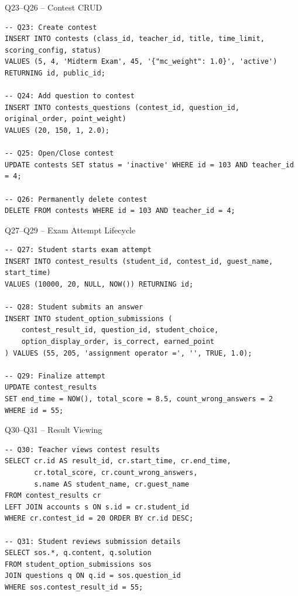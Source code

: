 \documentclass[aspectratio=169, 10pt]{beamer}
\begin{document}
\begin{frame}[fragile]{Q23--Q26 -- Contest CRUD}
    \begin{lstlisting}
-- Q23: Create contest
INSERT INTO contests (class_id, teacher_id, title, time_limit, scoring_config, status) 
VALUES (5, 4, 'Midterm Exam', 45, '{"mc_weight": 1.0}', 'active') 
RETURNING id, public_id;

-- Q24: Add question to contest
INSERT INTO contests_questions (contest_id, question_id, original_order, point_weight) 
VALUES (20, 150, 1, 2.0);

-- Q25: Open/Close contest
UPDATE contests SET status = 'inactive' WHERE id = 103 AND teacher_id = 4;

-- Q26: Permanently delete contest
DELETE FROM contests WHERE id = 103 AND teacher_id = 4;
    \end{lstlisting}
\end{frame}


\begin{frame}[fragile]{Q27--Q29 -- Exam Attempt Lifecycle}
    \begin{lstlisting}
-- Q27: Student starts exam attempt
INSERT INTO contest_results (student_id, contest_id, guest_name, start_time) 
VALUES (10000, 20, NULL, NOW()) RETURNING id;

-- Q28: Student submits an answer
INSERT INTO student_option_submissions (
    contest_result_id, question_id, student_choice, 
    option_display_order, is_correct, earned_point
) VALUES (55, 205, 'assignment operator =', '', TRUE, 1.0);

-- Q29: Finalize attempt
UPDATE contest_results
SET end_time = NOW(), total_score = 8.5, count_wrong_answers = 2
WHERE id = 55;
    \end{lstlisting}
\end{frame}


\begin{frame}[fragile]{Q30--Q31 -- Result Viewing}
    \begin{lstlisting}
-- Q30: Teacher views contest results
SELECT cr.id AS result_id, cr.start_time, cr.end_time, 
       cr.total_score, cr.count_wrong_answers,
       s.name AS student_name, cr.guest_name
FROM contest_results cr
LEFT JOIN accounts s ON s.id = cr.student_id
WHERE cr.contest_id = 20 ORDER BY cr.id DESC;

-- Q31: Student reviews submission details
SELECT sos.*, q.content, q.solution
FROM student_option_submissions sos
JOIN questions q ON q.id = sos.question_id
WHERE sos.contest_result_id = 55;
    \end{lstlisting}
\end{frame}
\end{document}
